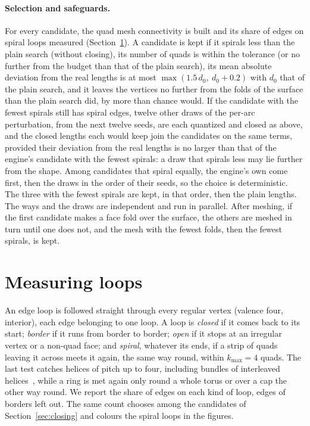 \documentclass[11pt,a4paper]{article}
\begin{document}
\paragraph{Selection and safeguards.}
For every candidate, the quad mesh connectivity is built and its share of
edges on spiral loops measured (Section~\ref{sec:measure}). A candidate is
kept if it spirals less than the plain search (without closing), its number
of quads is within the tolerance (or no further from the budget than that of
the plain search), its mean absolute deviation from the real lengths is at
most $\max(1.5\,d_0,\ d_0 + 0.2)$ with $d_0$ that of the plain search, and it
leaves the vertices no further from the folds of the surface than the plain
search did, by more than chance would. If the candidate with the fewest
spirals still has spiral edges, twelve other draws of the per-arc
perturbation, from the next twelve seeds, are each quantized and closed as
above, and the closed lengths each would keep join the candidates on the
same terms, provided their deviation from the real lengths is no larger than
that of the engine's candidate with the fewest spirals: a draw that spirals
less may lie further from the shape. Among candidates that spiral equally,
the engine's own come first, then the draws in the order of their seeds, so
the choice is deterministic. The three with the fewest spirals are kept, in
that order, then the plain lengths. The ways and the draws are independent
and run in parallel. After meshing, if the first candidate makes a face fold over
the surface, the others are meshed in turn until one does not, and the mesh
with the fewest folds, then the fewest spirals, is kept.

\section{Measuring loops}\label{sec:measure}

An edge loop is followed straight through every regular vertex (valence
four, interior), each edge belonging to one loop. A loop is \emph{closed} if
it comes back to its start; \emph{border} if it runs from border to border;
\emph{open} if it stops at an irregular vertex or a non-quad face; and
\emph{spiral}, whatever its ends, if a strip of quads leaving it across meets
it again, the same way round, within $k_{\max} = 4$ quads. The last test
catches helices of pitch up to four, including bundles of interleaved
helices~\cite{bommes2011structure}, while a ring is met again only round a
whole torus or over a cap the other way round. We report the share of edges
on each kind of loop, edges of borders left out. The same count chooses
among the candidates of Section~\ref{sec:closing} and colours the spiral
loops in the figures.
\end{document}
